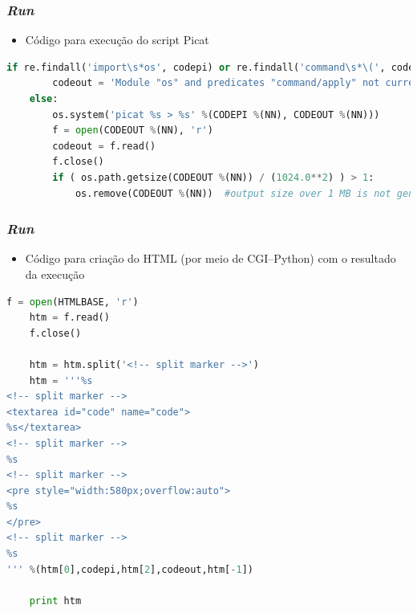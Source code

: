 \documentclass[brazil]{beamer}
\begin{document}
\begin{frame}[fragile]

    \frametitle{\textit{Run}}

    \begin{itemize}
      \item Código para execução do script Picat
    \end{itemize}

\begin{lstlisting}[language=Python]
    if re.findall('import\s*os', codepi) or re.findall('command\s*\(', codepi) or re.findall('apply\s*\(', codepi):
        codeout = 'Module "os" and predicates "command/apply" not currently available (code not executed)'
    else:
        os.system('picat %s > %s' %(CODEPI %(NN), CODEOUT %(NN)))
        f = open(CODEOUT %(NN), 'r')
        codeout = f.read()
        f.close()
        if ( os.path.getsize(CODEOUT %(NN)) / (1024.0**2) ) > 1:
            os.remove(CODEOUT %(NN))  #output size over 1 MB is not generated.
\end{lstlisting}

\end{frame}


\begin{frame}[fragile]

    \frametitle{\textit{Run}}

    \begin{itemize}
      \item Código para criação do HTML (por meio de CGI--Python) com o resultado da execução
    \end{itemize}

\begin{lstlisting}[language=Python]
    f = open(HTMLBASE, 'r')
    htm = f.read()
    f.close()
    
    htm = htm.split('<!-- split marker -->')
    htm = '''%s
<!-- split marker -->
<textarea id="code" name="code">
%s</textarea>
<!-- split marker -->
%s
<!-- split marker -->
<pre style="width:580px;overflow:auto">
%s
</pre>
<!-- split marker -->
%s
''' %(htm[0],codepi,htm[2],codeout,htm[-1])
    
    print htm
\end{lstlisting}

\end{frame}
\end{document}
